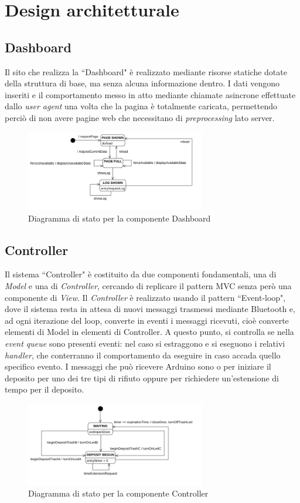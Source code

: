 \documentclass[a4paper, 12pt]{report}
\begin{document}
		\section{Design architetturale}
			\subsection{Dashboard}
			Il sito che realizza la ``Dashboard" è realizzato mediante risorse statiche dotate
			della struttura di base, ma senza alcuna informazione dentro. I dati vengono inseriti e il
			comportamento messo in atto mediante chiamate asincrone effettuate dallo \textit{user agent}
			una volta che la pagina è totalmente caricata, permettendo perciò di non avere pagine web
			che necessitano di \textit{preprocessing} lato server.
			\begin{figure}[H]
				\centering
				\includegraphics[width=0.7\textwidth]{"img/DashboardStatechart"}    
				\caption{Diagramma di stato per la componente Dashboard}
			\end{figure}
			\subsection{Controller}
			Il sistema ``Controller" è costituito da due componenti fondamentali, una di \textit{Model}
			e una di \textit{Controller}, cercando di replicare il pattern MVC senza però una componente
			di \textit{View}. Il \textit{Controller} è realizzato usando il pattern ``Event-loop", dove il
			sistema resta in attesa di nuovi messaggi trasmessi mediante Bluetooth e, ad ogni iterazione del 
			loop, converte in eventi i messaggi ricevuti, cioè converte elementi di Model in
			elementi di Controller. A questo punto, si controlla se nella \textit{event queue} sono
			presenti eventi: nel caso si estraggono e si eseguono i relativi \textit{handler}, che
			conterranno il comportamento da eseguire in caso accada quello specifico evento. I
			messaggi che può ricevere Arduino sono o per iniziare il deposito per uno dei tre
			tipi di rifiuto oppure per richiedere un'estensione di tempo per il deposito.
			\begin{figure}[H]
				\centering
				\includegraphics[width=0.7\textwidth]{"img/ControllerStatechart"}    
				\caption{Diagramma di stato per la componente Controller}
			\end{figure}
\end{document}
